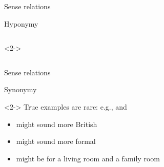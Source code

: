 \documentclass{beamer}
\newcommand{\subtwothree}{Sense relations}
\begin{document}
      \begin{frame}[t]{\subtwothree}
        \begin{alertblock}{Hyponymy}
          
        \end{alertblock}
        \begin{columns}
            \begin{minipage}[c][0.6\textheight]{\linewidth}
              \begin{example}<2->
              \end{example}
            \end{minipage}
        \end{columns}
      \end{frame}

      \begin{frame}[t]{\subtwothree}
        \begin{alertblock}{Synonymy}
          
        \end{alertblock}
        \begin{example}<2->
          True examples are rare: e.g.,  and 
          \begin{itemize}
            \item<3->  might sound more British
            \item<3->  might sound more formal
            \item<3->  might be for a living room and  a family room
          \end{itemize}
        \end{example}
      \end{frame}
\end{document}
